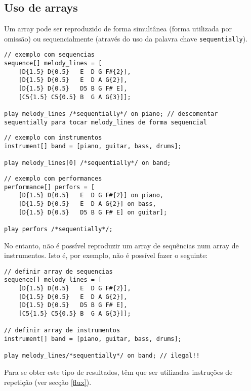 \documentclass{article}
\begin{document}
\subsection{Uso de arrays}
Um array pode ser reproduzido de forma simultânea (forma utilizada por omissão) ou sequencialmente (através do uso da palavra chave \texttt{sequentially}).

\begin{lstlisting} 
// exemplo com sequencias
sequence[] melody_lines = [
    [D{1.5} D{0.5}   E  D G F#{2}], 
    [D{1.5} D{0.5}   E  D A G{2}],
    [D{1.5} D{0.5}   D5 B G F# E],
    [C5{1.5} C5{0.5} B  G A G{3}]];

play melody_lines /*sequentially*/ on piano; // descomentar sequentially para tocar melody_lines de forma sequencial
\end{lstlisting}

\begin{lstlisting} 
// exemplo com instrumentos
instrument[] band = [piano, guitar, bass, drums];

play melody_lines[0] /*sequentially*/ on band;
\end{lstlisting}

\begin{lstlisting} 
// exemplo com performances
performance[] perfors = [
    [D{1.5} D{0.5}   E  D G F#{2}] on piano, 
    [D{1.5} D{0.5}   E  D A G{2}] on bass,
    [D{1.5} D{0.5}   D5 B G F# E] on guitar];
    
play perfors /*sequentially*/;
\end{lstlisting}
No entanto, não é possível reproduzir um array de sequências num array de instrumentos. Isto é, por exemplo, não é possível fazer o seguinte:

\begin{lstlisting} 
// definir array de sequencias
sequence[] melody_lines = [
    [D{1.5} D{0.5}   E  D G F#{2}], 
    [D{1.5} D{0.5}   E  D A G{2}],
    [D{1.5} D{0.5}   D5 B G F# E],
    [C5{1.5} C5{0.5} B  G A G{3}]];

// definir array de instrumentos
instrument[] band = [piano, guitar, bass, drums];

play melody_lines/*sequentially*/ on band; // ilegal!!
\end{lstlisting}

Para se obter este tipo de resultados, têm que ser utilizadas instruções de repetição (ver secção \ref{flux}).

\end{document}
